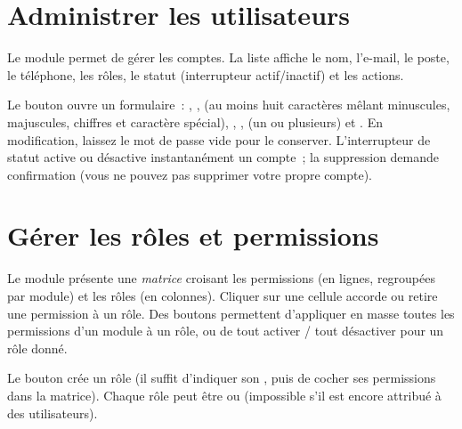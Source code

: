 
\section{Administrer les utilisateurs}

Le module  permet de gérer les comptes. La liste affiche le nom, l'e-mail, le poste, le téléphone, les rôles, le statut (interrupteur actif/inactif) et les actions.

Le bouton  ouvre un formulaire~: , ,  (au moins huit caractères mêlant minuscules, majuscules, chiffres et caractère spécial), , ,  (un ou plusieurs) et . En modification, laissez le mot de passe vide pour le conserver. L'interrupteur de statut active ou désactive instantanément un compte~; la suppression demande confirmation (vous ne pouvez pas supprimer votre propre compte).


\section{Gérer les rôles et permissions}

Le module  présente une \emph{matrice} croisant les permissions (en lignes, regroupées par module) et les rôles (en colonnes). Cliquer sur une cellule accorde ou retire une permission à un rôle. Des boutons permettent d'appliquer en masse toutes les permissions d'un module à un rôle, ou de tout activer / tout désactiver pour un rôle donné.

Le bouton  crée un rôle (il suffit d'indiquer son , puis de cocher ses permissions dans la matrice). Chaque rôle peut être  ou  (impossible s'il est encore attribué à des utilisateurs).



